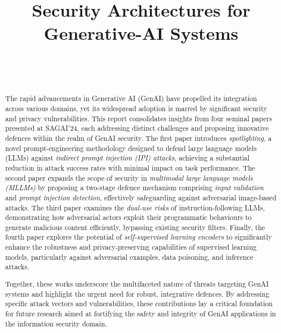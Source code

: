 \documentclass[journal]{IEEEtran}  %
\begin{document}
\title{Security Architectures for Generative-AI Systems}
\author{
    \\
    \\
}
\maketitle  %

\begin{abstract} 
The rapid advancements in Generative AI (GenAI) have propelled its integration across various domains, yet its widespread adoption is marred by significant security and privacy vulnerabilities. This report consolidates insights from four seminal papers presented at SAGAI'24, each addressing distinct challenges and proposing innovative defences within the realm of GenAI security. The first paper introduces \textit{spotlighting}, a novel prompt-engineering methodology designed to defend large language models (LLMs) against \textit{indirect prompt injection (IPI) attacks}, achieving a substantial reduction in attack success rates with minimal impact on task performance. The second paper expands the scope of security in \textit{multimodal large language models (MLLMs)} by proposing a two-stage defence mechanism comprising \textit{input validation} and \textit{prompt injection detection}, effectively safeguarding against adversarial image-based attacks. The third paper examines the \textit{dual-use risks} of instruction-following LLMs, demonstrating how adversarial actors exploit their programmatic behaviours to generate malicious content efficiently, bypassing existing security filters. Finally, the fourth paper explores the potential of \textit{self-supervised learning encoders} to significantly enhance the robustness and privacy-preserving capabilities of supervised learning models, particularly against adversarial examples, data poisoning, and inference attacks.

Together, these works underscore the multifaceted nature of threats targeting GenAI systems and highlight the urgent need for robust, integrative defences. By addressing specific attack vectors and vulnerabilities, these contributions lay a critical foundation for future research aimed at fortifying the safety and integrity of GenAI applications in the information security domain.
\end{abstract}
\end{document}
